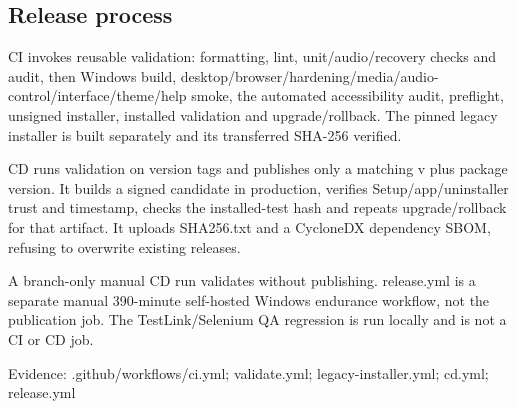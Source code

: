 \subsection{Release process}

CI invokes reusable validation: formatting, lint, unit/audio/recovery checks and audit, then Windows build, desktop/browser/hardening/media/audio-control/interface/theme/help smoke, the automated accessibility audit, preflight, unsigned installer, installed validation and upgrade/rollback. The pinned legacy installer is built separately and its transferred SHA-256 verified.

CD runs validation on version tags and publishes only a matching v plus package version. It builds a signed candidate in production, verifies Setup/app/uninstaller trust and timestamp, checks the installed-test hash and repeats upgrade/rollback for that artifact. It uploads SHA256.txt and a CycloneDX dependency SBOM, refusing to overwrite existing releases.

A branch-only manual CD run validates without publishing. release.yml is a separate manual 390-minute self-hosted Windows endurance workflow, not the publication job. The TestLink/Selenium QA regression is run locally and is not a CI or CD job.

Evidence: .github/workflows/ci.yml; validate.yml; legacy-installer.yml; cd.yml; release.yml
